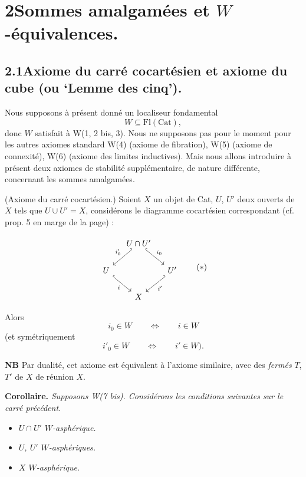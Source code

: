 \documentclass[11pt]{article}
\newcommand{\msp}[1]{\marginpar{\footnotesize [#1]}}
\begin{document}
\section*{2\quad Sommes amalgamées et $W$-équivalences.}

\subsection*{2.1\quad Axiome du carré cocartésien et axiome du cube (ou `Lemme des cinq').}

Nous supposons à présent donné un localiseur fondamental
\[
W\subseteq\mathrm{Fl}(\mathrm{Cat}),
\]
donc $W$ satisfait à W(1, 2 bis, 3). Nous ne supposons pas pour le moment pour les autres axiomes standard W(4) (axiome de fibration), W(5) (axiome de connexité), W(6) (axiome des limites inductives). Mais nous allons introduire à présent deux axiomes de stabilité supplémentaire, de nature différente, concernant les sommes amalgamées.

\begin{description}[leftmargin=5em, style=nextline]
\item[W(7 bis)] (Axiome du carré cocartésien.) Soient $X$ un objet de Cat, $U$, $U'$ deux ouverts de $X$ tels que $U\cup U'=X$, considérons le diagramme cocartésien correspondant (cf. prop. 5 en marge de la page) :

\msp{page 76}
\[
\begin{tikzcd}[column sep=small]
& U\cap U' \arrow[dl, hook', "i'_0"'] \arrow[dr, hook, "i_0"] & \\
U \arrow[dr, hook, "i"'] & & U' \arrow[dl, hook', "i'"] \\
& X &
\end{tikzcd}
\tag*{$(*)$}
\]

Alors
\[
i_0\in W\qquad\Longleftrightarrow\qquad i\in W
\]
(et symétriquement
\[
i'_0\in W\qquad\Longleftrightarrow\qquad i'\in W).
\]
\end{description}

\textbf{NB} Par dualité, cet axiome est équivalent à l'axiome similaire, avec des \textit{fermés} $T$, $T'$ de $X$ de réunion $X$.

\textbf{Corollaire.} \textit{Supposons \textup{W(7 bis)}. Considérons les conditions suivantes sur le carré précédent.}

\begin{itemize}
\item[\textit{a)}] \textit{$U\cap U'$ $W$-asphérique.}
\item[\textit{b)}] \textit{$U$, $U'$ $W$-asphériques.}
\item[\textit{c)}] \textit{$X$ $W$-asphérique.}
\end{itemize}
\end{document}
